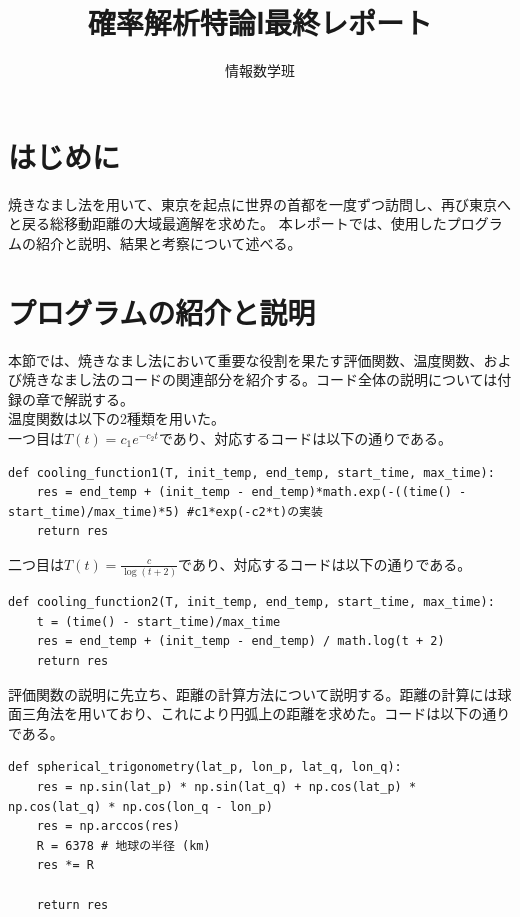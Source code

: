 \documentclass[a4paper,11pt]{ltjsarticle}
\begin{document}
\title{確率解析特論Ⅰ最終レポート}
\author{情報数学班}
\date{}
\maketitle
\tableofcontents

\section{はじめに}
焼きなまし法を用いて、東京を起点に世界の首都を一度ずつ訪問し、再び東京へと戻る総移動距離の大域最適解を求めた。
本レポートでは、使用したプログラムの紹介と説明、結果と考察について述べる。
\section{プログラムの紹介と説明}
本節では、焼きなまし法において重要な役割を果たす評価関数、温度関数、および焼きなまし法のコードの関連部分を紹介する。コード全体の説明については付録の章で解説する。\\

温度関数は以下の2種類を用いた。\\
一つ目は$T(t)=c_{1}e^{-c_{2}t}$であり、対応するコードは以下の通りである。
\begin{lstlisting}
def cooling_function1(T, init_temp, end_temp, start_time, max_time):
    res = end_temp + (init_temp - end_temp)*math.exp(-((time() - start_time)/max_time)*5) #c1*exp(-c2*t)の実装
    return res
\end{lstlisting}
\clearpage
二つ目は$T(t)=\frac{c}{\log{(t+2)}}$であり、対応するコードは以下の通りである。
\begin{lstlisting}
def cooling_function2(T, init_temp, end_temp, start_time, max_time):
    t = (time() - start_time)/max_time
    res = end_temp + (init_temp - end_temp) / math.log(t + 2)
    return res    
\end{lstlisting}

評価関数の説明に先立ち、距離の計算方法について説明する。距離の計算には球面三角法を用いており、これにより円弧上の距離を求めた。コードは以下の通りである。
\begin{lstlisting}
def spherical_trigonometry(lat_p, lon_p, lat_q, lon_q):
    res = np.sin(lat_p) * np.sin(lat_q) + np.cos(lat_p) * np.cos(lat_q) * np.cos(lon_q - lon_p)
    res = np.arccos(res)
    R = 6378 # 地球の半径 (km)
    res *= R
    
    return res
\end{lstlisting}
\end{document}
